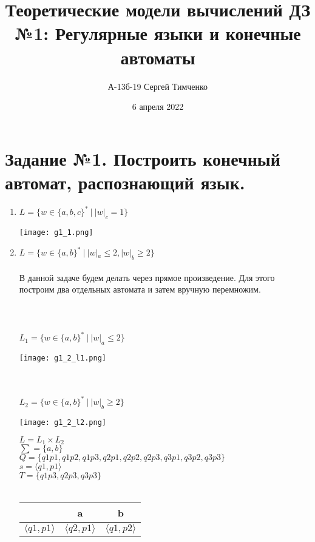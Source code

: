\documentclass{article}
\title{Теоретические модели вычислений ДЗ №1: Регулярные языки и конечные автоматы}
\author{А-13б-19 Сергей Тимченко}
\date{6 апреля 2022}
\begin{document}
\maketitle
\section{Задание №1. Построить конечный автомат, распознающий язык.}

\begin{enumerate}
    \item {$L = \{ w \in \{ a, b, c\}^* \ | \ |w|_c = 1\}$}
    \begin{flushleft}
        \texttt{[image: g1\_1.png]}
    \end{flushleft}
    \item {$L = \{ w \in \{ a, b\}^* \ | \ |w|_a \leq 2, |w|_b \geq 2 \}$} \\ \\
    В данной задаче будем делать через прямое произведение. Для этого построим два отдельных автомата и затем вручную перемножим. \\ \\
     \\ \\
    $L_1 = \{ w \in \{ a, b\}^* \ | \ |w|_a \leq 2 \}$
    \begin{flushleft}
        \texttt{[image: g1\_2\_l1.png]}
    \end{flushleft}
     \\ \\
    $L_2 = \{ w \in \{ a, b\}^* \ | \ |w|_b \geq 2 \}$
    \begin{flushleft}
        \texttt{[image: g1\_2\_l2.png]}
    \end{flushleft}
    $L = L_1 \times L_2$ \\
    $\sum = \{a, b\}$ \\
    $Q = \{q1p1, q1p2, q1p3, q2p1, q2p2, q2p3, q3p1, q3p2, q3p3\}$ \\
    $s = \langle q1, p1 \rangle $ \\
    $T = \{q1p3, q2p3, q3p3\}$ \\ \\
    \begin{tabular}{|c|c|c|}
        \hline
                              & a                         & b     \\ \hline
         $\langle q1,p1 \rangle$    & $\langle q2,p1 \rangle$   & $\langle q1,p2 \rangle$    \\

\end{tabular}
\end{enumerate}
\end{document}

